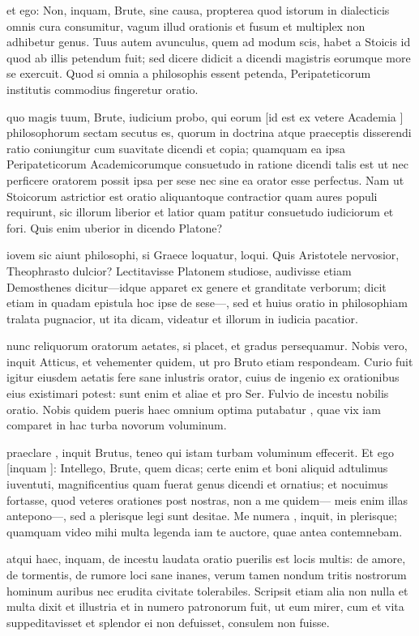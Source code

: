  et ego: Non, inquam, Brute, sine causa, propterea quod istorum in dialecticis omnis cura consumitur, vagum illud orationis et fusum et multiplex non adhibetur genus. Tuus autem avunculus, quem ad modum scis, habet a Stoicis id quod ab illis petendum fuit; sed dicere didicit a dicendi magistris eorumque more se exercuit. Quod si omnia a philosophis essent petenda, Peripateticorum institutis commodius fingeretur oratio.

 quo magis tuum, Brute, iudicium probo, qui eorum [id est ex vetere Academia ] philosophorum sectam secutus es, quorum in doctrina atque praeceptis disserendi ratio coniungitur cum suavitate dicendi et copia; quamquam ea ipsa Peripateticorum Academicorumque consuetudo in ratione dicendi talis est ut nec perficere oratorem possit ipsa per sese nec sine ea orator esse perfectus. Nam ut Stoicorum astrictior est oratio aliquantoque contractior quam aures populi requirunt, sic illorum liberior et latior quam patitur consuetudo iudiciorum et fori. Quis enim uberior in dicendo Platone?

 iovem sic aiunt philosophi, si Graece loquatur, loqui. Quis Aristotele nervosior, Theophrasto dulcior? Lectitavisse Platonem studiose, audivisse etiam Demosthenes dicitur—idque apparet ex genere et granditate verborum; dicit etiam in quadam epistula hoc ipse de sese—, sed et huius oratio in philosophiam tralata pugnacior, ut ita dicam, videatur et illorum in iudicia pacatior.

 nunc reliquorum oratorum aetates, si placet, et gradus persequamur. Nobis vero, inquit Atticus, et vehementer quidem, ut pro Bruto etiam respondeam. Curio fuit igitur eiusdem aetatis fere sane inlustris orator, cuius de ingenio ex orationibus eius existimari potest: sunt enim et aliae et pro Ser. Fulvio de incestu nobilis oratio. Nobis quidem pueris haec omnium optima putabatur , quae vix iam comparet in hac turba novorum voluminum.

 praeclare , inquit Brutus, teneo qui istam turbam voluminum effecerit. Et ego [inquam ]: Intellego, Brute, quem dicas; certe enim et boni aliquid adtulimus iuventuti, magnificentius quam fuerat genus dicendi et ornatius; et nocuimus fortasse, quod veteres orationes post nostras, non a me quidem— meis enim illas antepono—, sed a plerisque legi sunt desitae. Me numera , inquit, in plerisque; quamquam video mihi multa legenda iam te auctore, quae antea contemnebam.

 atqui haec, inquam, de incestu laudata oratio puerilis est locis multis: de amore, de tormentis, de rumore loci sane inanes, verum tamen nondum tritis nostrorum hominum auribus nec erudita civitate tolerabiles. Scripsit etiam alia non nulla et multa dixit et illustria et in numero patronorum fuit, ut eum mirer, cum et vita suppeditavisset et splendor ei non defuisset, consulem non fuisse.

